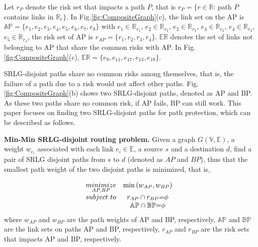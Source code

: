 Let $r_P$ denote the risk set that impacts a path $P$, that is $r_P=\{r\in \mathbb{R}$: path $P$ contains links in $\mathbb{R}_r\}$. In Fig.\ref{fig:CompositeGraph}(c), the link set on the AP is $\mathbb{AP}=\{e_1,e_2,e_3,e_4,e_5,e_6,e_7,e_8\}$ with $e_1\in \mathbb{R}_{r_1}$, $e_2\in \mathbb{R}_{r_2}$, $e_2\in \mathbb{R}_{r_3}$, $e_3\in \mathbb{R}_{r_2}$, $e_4\in \mathbb{R}_{r_3}$, $e_5\in \mathbb{R}_{r_4}$,  the risk set of AP is ${r}_{{AP}}=\{r_1, r_2, r_3, r_4\}$. $\mathbb{\mathbb{ER}}$ denotes the set of links not belonging to AP that share the common risks with AP. In Fig.\ref{fig:CompositeGraph}(c), $\mathbb{\mathbb{ER}}=\{e_9,e_{11},e_{17},e_{13},e_{19}\}$.

SRLG-disjoint paths share no common risks among themselves, that is, the failure of a path due to a risk would not affect other paths. Fig.\ref{fig:CompositeGraph}(b) shows two SRLG-disjoint paths, denoted as AP and BP. As these two paths share no common risk, if AP fails, BP can still work. This paper focuses on finding  two SRLG-disjoint paths for path protection, which can be described as follows.

\textbf{Min-Min SRLG-disjoint routing problem.} Given a graph $G(\mathbb{V},\mathbb{E})$, a weight $w_{e_i}$ associated with each link $e_i\in \mathbb{E}$, a source  $s$ and a destination  $d$,  find a pair of SRLG disjoint paths from $s$ to $d$ (denoted as $AP$ and $BP$), thus that  the smallest path weight of the two disjoint paths is minimized, that is,

\begin{equation}
\begin{array}{*{20}{c}}
   {\mathop {minimize}\limits_{AP,BP} } & {\min \left( {{w_{AP}},{w_{BP}}} \right)}  \\
   {subject\ to} & {{r_{AP}} \cap {r_{BP}}{\rm{ = }}\phi }  \\
   {} & {\mathbb{AP} \cap \mathbb{BP}{\rm{ = }}\phi }  \\
\end{array}
\label{eq:problem definition}
\end{equation}
where ${w_{AP}}$ and ${w_{BP}}$ are the path weights of AP and BP, respectively, $\mathbb{AP}$ and $\mathbb{BP}$ are the link sets on paths AP and BP, respectively, ${r_{AP}}$ and ${r_{BP}}$ are the risk sets that impacts AP and BP, respectively.

